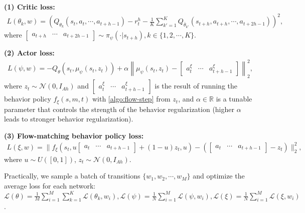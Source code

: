 \textbf{(1) Critic loss:}
\begin{align}
    L(\theta_k, w) = \left(Q_{\theta_k}(s_t, a_t, \cdots, a_{t+h-1}) - r^h_t - \frac{1}{K}\sum_{k'=1}^{K} Q_{\bar \theta_{k'}}(s_{t+h}, a_{t+h}, \cdots, a_{t+2h-1})\right)^2,
\end{align}
where $\begin{bmatrix} a_{t+h} & \cdots & a_{t+2h-1} \end{bmatrix} \sim \pi_\psi(\cdot | s_{t+h}), k \in \{1, 2, \cdots, K\}$.

\textbf{(2) Actor loss:}
\begin{align}
    L(\psi, w) = -Q_\theta(s_t, \mu_\psi(s_t, z_t)) + \alpha \left\|\mu_\psi(s_t, z_t) - \begin{bmatrix} a^\xi_t & \cdots & a^\xi_{t+h-1} \end{bmatrix}\right\|_2^2,
\end{align}
where $z_t \sim \mathcal{N}(0, I_{Ah})$ and  $\begin{bmatrix} a^\xi_t & \cdots & a^\xi_{t+h-1} \end{bmatrix}$ is the result of running the behavior policy $f_\xi(s, m, t)$ with \cref{algo:flow-step} from $z_t$, and $\alpha \in \mathbb{R}$ is a tunable parameter that controls the strength of the behavior regularization (higher $\alpha$ leads to stronger behavior regularization).

\textbf{(3) Flow-matching behavior policy loss:}
\begin{align}
    L(\xi, w) = \|f_\xi(s_t, u\begin{bmatrix} a_t & \cdots & a_{t+h-1} \end{bmatrix} + (1-u)z_t, u) - (\begin{bmatrix} a_t & \cdots & a_{t+h-1} \end{bmatrix} - z_t)\|_2^2,
    \label{eq:fql-flow}
\end{align}
where $u \sim U([0, 1])$, $z_t \sim \mathcal{N}(0, I_{Ah})$.

Practically, we sample a batch of transitions $\{w_1, w_2, \cdots, w_M\}$ and optimize the average loss for each network: $\mathcal{L}(\theta) = \frac{1}{M}\sum_{i=1}^M \sum_{k=1}^K \mathcal{L}(\theta_k, w_i), \mathcal{L}(\psi) = \frac{1}{N}\sum_{i=1}^M  \mathcal{L}(\psi, w_i), \mathcal{L}(\xi) = \frac{1}{N}\sum_{i=1}^M \mathcal{L}(\xi, w_i)$.

